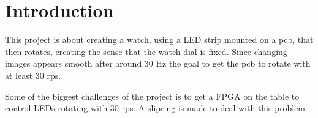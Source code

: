 \section{Introduction}
This project is about creating a watch, using a LED strip mounted on a pcb, that then rotates, creating the sense that the watch dial is fixed. 
Since changing images appears smooth after around 30 Hz \cite{article:rpm} the goal to get the pcb to rotate with at least 30 rps.

Some of the biggest challenges of the project is to get a FPGA on the table to control LEDs rotating with 30 rps.
A slipring is made to deal with this problem.